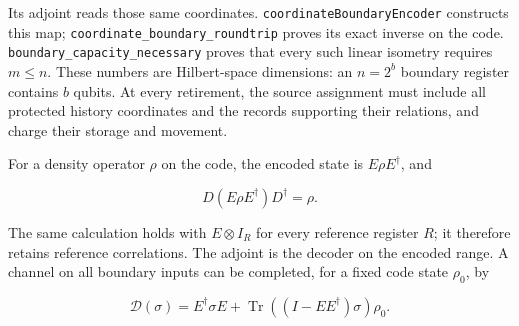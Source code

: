 \documentclass[
]{article}
\begin{document}
Its adjoint reads those same coordinates.
\texttt{c\allowbreak{}o\allowbreak{}o\allowbreak{}r\allowbreak{}d\allowbreak{}i\allowbreak{}n\allowbreak{}a\allowbreak{}t\allowbreak{}e\allowbreak{}B\allowbreak{}o\allowbreak{}u\allowbreak{}n\allowbreak{}d\allowbreak{}a\allowbreak{}r\allowbreak{}y\allowbreak{}E\allowbreak{}n\allowbreak{}c\allowbreak{}o\allowbreak{}d\allowbreak{}e\allowbreak{}r}
constructs this map;
\texttt{c\allowbreak{}o\allowbreak{}o\allowbreak{}r\allowbreak{}d\allowbreak{}i\allowbreak{}n\allowbreak{}a\allowbreak{}t\allowbreak{}e\allowbreak{}\_\allowbreak{}b\allowbreak{}o\allowbreak{}u\allowbreak{}n\allowbreak{}d\allowbreak{}a\allowbreak{}r\allowbreak{}y\allowbreak{}\_\allowbreak{}r\allowbreak{}o\allowbreak{}u\allowbreak{}n\allowbreak{}d\allowbreak{}t\allowbreak{}r\allowbreak{}i\allowbreak{}p}
proves its exact inverse on the code.
\texttt{b\allowbreak{}o\allowbreak{}u\allowbreak{}n\allowbreak{}d\allowbreak{}a\allowbreak{}r\allowbreak{}y\allowbreak{}\_\allowbreak{}c\allowbreak{}a\allowbreak{}p\allowbreak{}a\allowbreak{}c\allowbreak{}i\allowbreak{}t\allowbreak{}y\allowbreak{}\_\allowbreak{}n\allowbreak{}e\allowbreak{}c\allowbreak{}e\allowbreak{}s\allowbreak{}s\allowbreak{}a\allowbreak{}r\allowbreak{}y}
proves that every such linear isometry requires \(m\le n\). These
numbers are Hilbert-space dimensions: an \(n=2^b\) boundary register
contains \(b\) qubits. At every retirement, the source assignment must
include all protected history coordinates and the records supporting
their relations, and charge their storage and movement.

For a density operator \(\rho\) on the code, the encoded state is
\(E\rho E^\dagger\), and

\[
D(E\rho E^\dagger)D^\dagger=\rho.
\]

The same calculation holds with \(E\otimes I_R\) for every reference
register \(R\); it therefore retains reference correlations. The adjoint
is the decoder on the encoded range. A channel on all boundary inputs
can be completed, for a fixed code state \(\rho_0\), by

\[
\mathcal D(\sigma)=E^\dagger\sigma E+
 \operatorname{Tr}((I-EE^\dagger)\sigma)\rho_0.
\]
\end{document}
